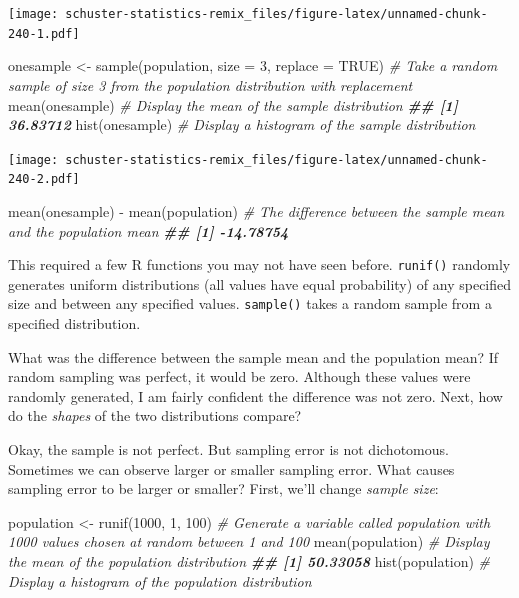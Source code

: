 \documentclass[
]{book}
\newenvironment{Shaded}{\begin{snugshade}}{\end{snugshade}}
\newcommand{\AttributeTok}[1]{\textcolor[rgb]{0.77,0.63,0.00}{#1}}
\newcommand{\CommentTok}[1]{\textcolor[rgb]{0.56,0.35,0.01}{\textit{#1}}}
\newcommand{\ConstantTok}[1]{\textcolor[rgb]{0.00,0.00,0.00}{#1}}
\newcommand{\DecValTok}[1]{\textcolor[rgb]{0.00,0.00,0.81}{#1}}
\newcommand{\DocumentationTok}[1]{\textcolor[rgb]{0.56,0.35,0.01}{\textbf{\textit{#1}}}}
\newcommand{\FunctionTok}[1]{\textcolor[rgb]{0.00,0.00,0.00}{#1}}
\newcommand{\NormalTok}[1]{#1}
\newcommand{\OtherTok}[1]{\textcolor[rgb]{0.56,0.35,0.01}{#1}}
\newcommand{\SpecialCharTok}[1]{\textcolor[rgb]{0.00,0.00,0.00}{#1}}
\begin{document}
\texttt{[image: schuster-statistics-remix\_files/figure-latex/unnamed-chunk-240-1.pdf]}

\begin{Shaded}
\begin{Highlighting}[]
\NormalTok{onesample }\OtherTok{\textless{}{-}} \FunctionTok{sample}\NormalTok{(population, }\AttributeTok{size =} \DecValTok{3}\NormalTok{, }\AttributeTok{replace =} \ConstantTok{TRUE}\NormalTok{) }\CommentTok{\# Take a random sample of size 3 from the population distribution with replacement}
\FunctionTok{mean}\NormalTok{(onesample) }\CommentTok{\# Display the mean of the sample distribution}
\DocumentationTok{\#\# [1] 36.83712}
\FunctionTok{hist}\NormalTok{(onesample) }\CommentTok{\# Display a histogram of the sample distribution}
\end{Highlighting}
\end{Shaded}

\texttt{[image: schuster-statistics-remix\_files/figure-latex/unnamed-chunk-240-2.pdf]}

\begin{Shaded}
\begin{Highlighting}[]
\FunctionTok{mean}\NormalTok{(onesample) }\SpecialCharTok{{-}} \FunctionTok{mean}\NormalTok{(population) }\CommentTok{\# The difference between the sample mean and the population mean}
\DocumentationTok{\#\# [1] {-}14.78754}
\end{Highlighting}
\end{Shaded}

This required a few R functions you may not have seen before. \texttt{runif()} randomly generates uniform distributions (all values have equal probability) of any specified size and between any specified values. \texttt{sample()} takes a random sample from a specified distribution.

What was the difference between the sample mean and the population mean? If random sampling was perfect, it would be zero. Although these values were randomly generated, I am fairly confident the difference was not zero. Next, how do the \emph{shapes} of the two distributions compare?

Okay, the sample is not perfect. But sampling error is not dichotomous. Sometimes we can observe larger or smaller sampling error. What causes sampling error to be larger or smaller? First, we'll change \emph{sample size}:

\begin{Shaded}
\begin{Highlighting}[]
\NormalTok{population }\OtherTok{\textless{}{-}} \FunctionTok{runif}\NormalTok{(}\DecValTok{1000}\NormalTok{, }\DecValTok{1}\NormalTok{, }\DecValTok{100}\NormalTok{) }\CommentTok{\# Generate a variable called \textquotesingle{}population\textquotesingle{} with 1000 values chosen at random between 1 and 100}
\FunctionTok{mean}\NormalTok{(population) }\CommentTok{\# Display the mean of the population distribution}
\DocumentationTok{\#\# [1] 50.33058}
\FunctionTok{hist}\NormalTok{(population) }\CommentTok{\# Display a histogram of the population distribution}
\end{Highlighting}
\end{Shaded}
\end{document}
